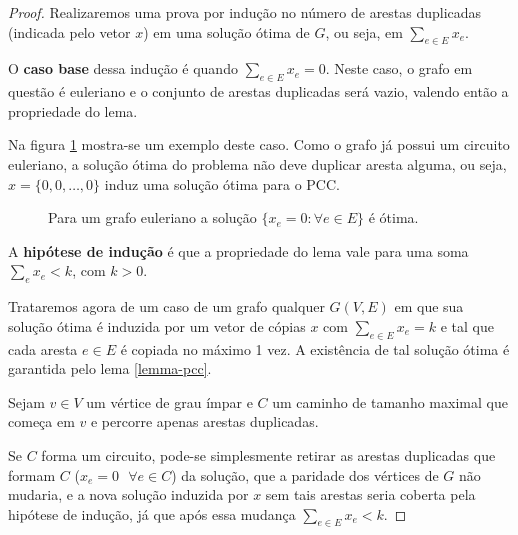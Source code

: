 \begin{proof}
    Realizaremos uma prova por indução no número de arestas duplicadas (indicada pelo vetor $x$) em uma solução ótima de $G$, ou seja, em $\sum_{e\in E} x_e$. 

    O \textbf{caso base} dessa indução é quando $\sum_{e\in E} x_e = 0$. 
    Neste caso, o grafo em questão é euleriano e o conjunto de arestas duplicadas será vazio, valendo então a propriedade do lema.

    Na figura \ref{pcc-case2} mostra-se um exemplo deste caso.
    Como o grafo já possui um circuito euleriano, a solução ótima do problema não deve duplicar aresta alguma, ou seja, $x = \{0, 0, \dots, 0\}$ induz uma solução ótima para o PCC.

    \begin{figure}[H]
        \centering
        \caption{Para um grafo euleriano a solução $\{x_e = 0 : \forall e \in E \}$ é ótima.}
        \label{pcc-case2}
    \end{figure}

    A \textbf{hipótese de indução} é que a propriedade do lema vale para uma soma $\sum_e x_e < k$, com $k > 0$.

    Trataremos agora de um caso de um grafo qualquer $G(V, E)$ em que sua solução ótima é induzida por um vetor de cópias $x$ com $\sum_{e\in E} x_e = k$ e tal que cada aresta $e \in E$ é copiada no máximo 1 vez.
    A existência de tal solução ótima é garantida pelo lema \ref{lemma-pcc}.

    Sejam $v \in V$ um vértice de grau ímpar e $C$ um caminho de tamanho maximal que começa em $v$ e percorre apenas arestas duplicadas.

    Se $C$ forma um circuito, pode-se simplesmente retirar as arestas duplicadas que formam $C$ ($x_e = 0 \text{ } \forall e \in C$) da solução, que a paridade dos vértices de $G$ não mudaria, e a nova solução induzida por $x$ sem tais arestas seria coberta pela hipótese de indução, já que após essa mudança $\sum_{e\in E} x_e < k$.


\end{proof}

